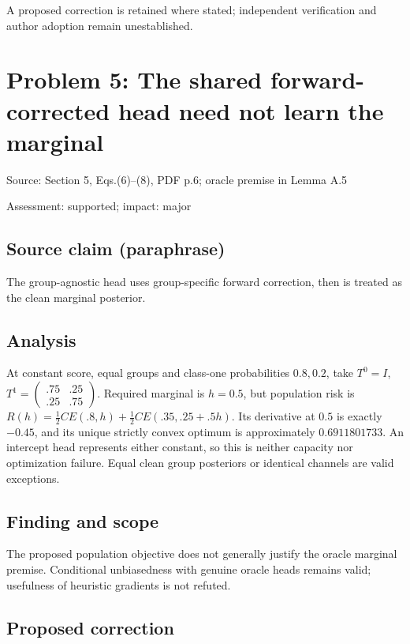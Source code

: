 \documentclass[11pt]{article}
\begin{document}
A proposed correction is retained where stated; independent verification and author adoption remain unestablished.

\section*{Problem 5: The shared forward-corrected head need not learn the marginal}

Source: Section 5, Eqs.(6)–(8), PDF p.6; oracle premise in Lemma A.5

Assessment: supported; impact: major

\subsection*{Source claim (paraphrase)}

The group-agnostic head uses group-specific forward correction, then is treated as the clean marginal posterior.

\subsection*{Analysis}

At constant score, equal groups and class-one probabilities \(0.8,0.2\), take \(T^0=I\), \(T^1=\begin{pmatrix}.75&.25\\.25&.75\end{pmatrix}\). Required marginal is \(h=0.5\), but population risk is \(R(h)=\tfrac12 CE(.8,h)+\tfrac12 CE(.35,.25+.5h)\). Its derivative at \(0.5\) is exactly \(-0.45\), and its unique strictly convex optimum is approximately \(0.6911801733\). An intercept head represents either constant, so this is neither capacity nor optimization failure. Equal clean group posteriors or identical channels are valid exceptions.

\subsection*{Finding and scope}

The proposed population objective does not generally justify the oracle marginal premise. Conditional unbiasedness with genuine oracle heads remains valid; usefulness of heuristic gradients is not refuted.

\subsection*{Proposed correction}
\end{document}
